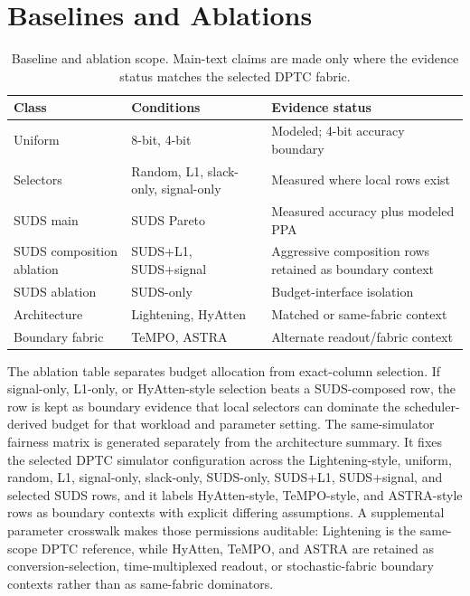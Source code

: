 \documentclass[10pt,journal]{IEEEtran}
\begin{document}
\section{Baselines and Ablations}

\begin{table}[t]
\centering
\caption{Baseline and ablation scope. Main-text claims are made only where
the evidence status matches the selected DPTC fabric.}
\label{tab:baseline-contract}
\footnotesize
\begin{tabular}{@{}p{}p{}p{}@{}}
\toprule
Class & Conditions & Evidence status \\
\midrule
Uniform & 8-bit, 4-bit & Modeled; 4-bit accuracy boundary \\
Selectors & Random, L1, slack-only, signal-only & Measured where local rows exist \\
SUDS main & SUDS Pareto & Measured accuracy plus modeled PPA \\
SUDS composition ablation & SUDS+L1, SUDS+signal & Aggressive composition rows retained as boundary context \\
SUDS ablation & SUDS-only & Budget-interface isolation \\
Architecture & Lightening, HyAtten & Matched or same-fabric context \\
Boundary fabric & TeMPO, ASTRA & Alternate readout/fabric context \\
\bottomrule
\end{tabular}
\end{table}

The ablation table separates budget allocation from exact-column selection. If
signal-only, L1-only, or HyAtten-style selection beats a SUDS-composed row, the
row is kept as boundary evidence that local selectors can dominate the
scheduler-derived budget for that workload and parameter setting.
The same-simulator fairness matrix is generated separately from the architecture
summary. It fixes the selected DPTC simulator configuration across the
Lightening-style, uniform, random, L1, signal-only, slack-only, SUDS-only,
SUDS+L1, SUDS+signal, and selected SUDS rows, and it labels HyAtten-style,
TeMPO-style, and ASTRA-style rows as boundary contexts with explicit differing
assumptions. A supplemental parameter crosswalk makes those permissions
auditable: Lightening is the same-scope DPTC reference, while HyAtten, TeMPO,
and ASTRA are retained as conversion-selection, time-multiplexed readout, or
stochastic-fabric boundary contexts rather than as same-fabric dominators.
\end{document}
